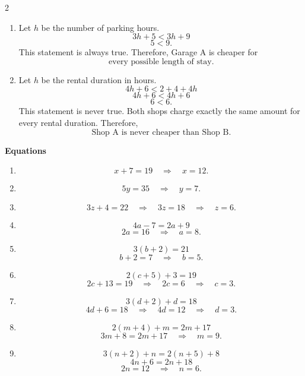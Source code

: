 \begin{multicols}{2}
\begin{enumerate}[label=\textbf{\arabic*.}]
			\item Let $h$ be the number of parking hours.
			\[
			3h+5<3h+9
			\]
			\[
			5<9.
			\]
			This statement is always true. Therefore, Garage A is cheaper for
			\[
			\boxed{\text{every possible length of stay}}.
			\]
			
			\item Let $h$ be the rental duration in hours.
			\[
			4h+6<2+4+4h
			\]
			\[
			4h+6<4h+6
			\]
			\[
			6<6.
			\]
			This statement is never true. Both shops charge exactly the same amount
			for every rental duration. Therefore,
			\[
			\boxed{\text{Shop A is never cheaper than Shop B}}.
			\]
			
			
		\end{enumerate}
		
		\bigskip
		
		\textbf{Equations}
		
		\begin{enumerate}[label=\textbf{\arabic*.},start=8]
			
			\item
			\[
			x+7=19
			\quad\Longrightarrow\quad
			\boxed{x=12}.
			\]
			
			\item
			\[
			5y=35
			\quad\Longrightarrow\quad
			\boxed{y=7}.
			\]
			
			\item
			\[
			3z+4=22
			\quad\Longrightarrow\quad
			3z=18
			\quad\Longrightarrow\quad
			\boxed{z=6}.
			\]
			
			\item
			\[
			4a-7=2a+9
			\]
			\[
			2a=16
			\quad\Longrightarrow\quad
			\boxed{a=8}.
			\]
			
			\item
			\[
			3(b+2)=21
			\]
			\[
			b+2=7
			\quad\Longrightarrow\quad
			\boxed{b=5}.
			\]
			
			\item
			\[
			2(c+5)+3=19
			\]
			\[
			2c+13=19
			\quad\Longrightarrow\quad
			2c=6
			\quad\Longrightarrow\quad
			\boxed{c=3}.
			\]
			
			\item
			\[
			3(d+2)+d=18
			\]
			\[
			4d+6=18
			\quad\Longrightarrow\quad
			4d=12
			\quad\Longrightarrow\quad
			\boxed{d=3}.
			\]
			
			\item
			\[
			2(m+4)+m=2m+17
			\]
			\[
			3m+8=2m+17
			\quad\Longrightarrow\quad
			\boxed{m=9}.
			\]
			
			\item
			\[
			3(n+2)+n=2(n+5)+8
			\]
			\[
			4n+6=2n+18
			\]
			\[
			2n=12
			\quad\Longrightarrow\quad
			\boxed{n=6}.
			\]
			

\end{enumerate}
\end{multicols}
